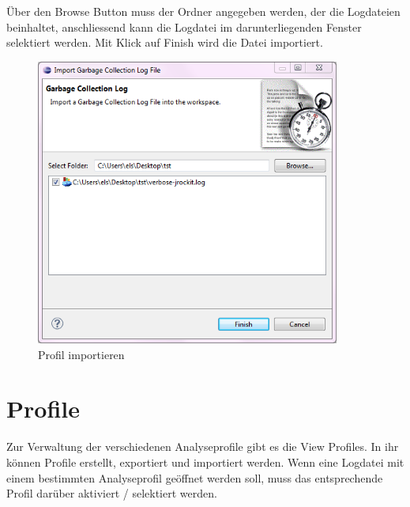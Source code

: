 Über den Browse Button muss der Ordner angegeben werden, der die Logdateien beinhaltet, anschliessend kann die Logdatei im darunterliegenden Fenster selektiert werden. Mit Klick auf Finish wird die Datei importiert.
 \begin{figure}[H]
  	\centering
    	\includegraphics[width=10cm]{images/tutorial_importlog}
        	\caption{Profil importieren}
\end{figure}

\section{Profile}
Zur Verwaltung der verschiedenen Analyseprofile gibt es die View Profiles. In ihr können Profile erstellt, exportiert und importiert werden. Wenn eine Logdatei mit einem bestimmten Analyseprofil geöffnet werden soll, muss das entsprechende Profil darüber aktiviert / selektiert werden.

